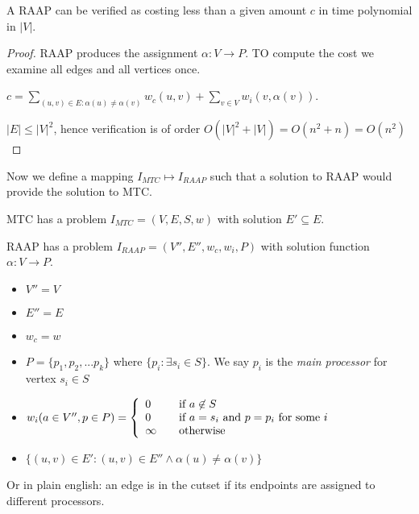 \documentclass{article}
\begin{document}
\begin{observation}
\label{RAAPNP}
A RAAP can be verified as costing less than a given amount $c$ in time polynomial in $|V|$.
\end{observation}

\begin{proof}
RAAP produces the assignment $\alpha : V \rightarrow P$.
TO compute the cost we examine all edges and all vertices once.

$c = \displaystyle\sum\limits_{(u,v) \in E : \alpha(u) \neq \alpha(v)} w_c(u,v) + \displaystyle\sum\limits_{v \in V} w_i(v, \alpha(v))$.

$|E| \leq |V|^2$, hence verification is of order $O(|V|^2 + |V|) = O(n^2 + n) = O(n^2)$
\end{proof}

Now we define a mapping $I_{MTC} \mapsto I_{RAAP}$ such that a solution to RAAP would provide the solution to MTC.

MTC has a problem $I_{MTC} = (V,E,S,w)$ with solution $E' \subseteq E$.

RAAP has a problem $I_{RAAP} = (V'',E'',w_c,w_i,P)$ with solution function $\alpha : V \rightarrow P$.

\begin{itemize}
	\item $V'' = V$
	\item $E'' = E$
	\item $w_c = w$
	\item $P = \{p_1, p_2, ... p_k\}$ where $\{p_i : \exists s_i \in S \}$.  We say $p_i$ is the {\em main processor} for vertex $s_i \in S$
	\item $w_i(a \in V'',p \in P) = \left\{ 
		\begin{array}{l l}
			0 & \quad \mbox{if $a \not\in S$}\\
			0 & \quad \mbox{if $a = s_i$ and $p = p_i$ for some $i$}\\
			\infty & \quad \mbox{otherwise}\\ \end{array} \right.$
	\item $\{(u,v) \in E' : (u,v) \in E'' \wedge \alpha(u) \neq \alpha(v)\}$
\end{itemize}

Or in plain english: an edge is in the cutset if its endpoints are assigned to different processors.
\end{document}
